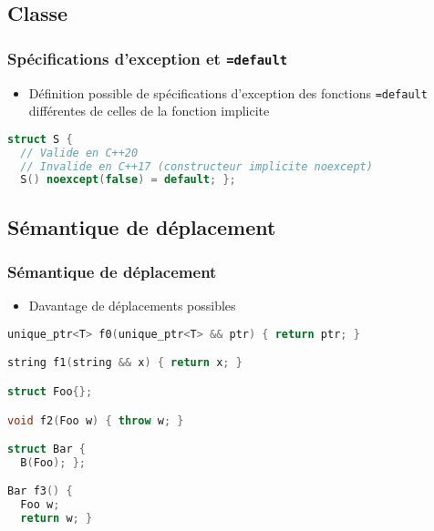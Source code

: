 \documentclass[C++.tex]{subfiles}
\begin{document}
\subsection*{Classe}
\begin{frame}[fragile]
	\frametitle{Spécifications d'exception et \lstinline|=default|}
	\begin{itemize}
		\item Définition possible de spécifications d'exception des fonctions \lstinline|=default| différentes de celles de la fonction implicite
	\end{itemize}
		
	\begin{lstlisting}[language=C++]
struct S {
  // Valide en C++20
  // Invalide en C++17 (constructeur implicite noexcept)
  S() noexcept(false) = default; };\end{lstlisting}
\end{frame}

\subsection*{Sémantique de déplacement}
\begin{frame}[fragile]
	\frametitle{Sémantique de déplacement}
	\begin{itemize}
		\item Davantage de déplacements possibles
	\end{itemize}
		
	\begin{lstlisting}[language=C++]
unique_ptr<T> f0(unique_ptr<T> && ptr) { return ptr; }

string f1(string && x) { return x; }

struct Foo{};

void f2(Foo w) { throw w; }

struct Bar {
  B(Foo); };

Bar f3() {
  Foo w;
  return w; }\end{lstlisting}

\end{frame}
\end{document}
